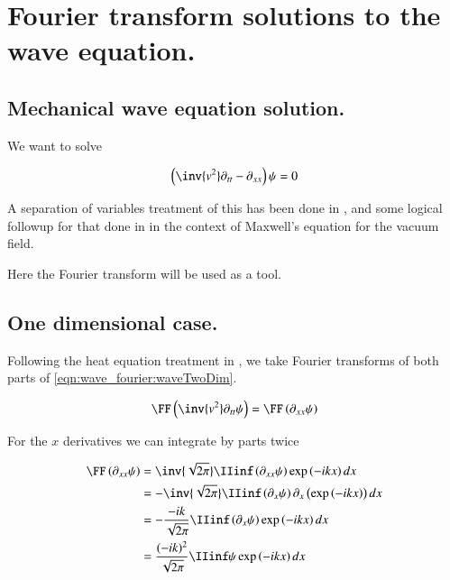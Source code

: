 \chapter{Fourier transform solutions to the wave equation.}\label{chap:PJwaveFourier}
\label{chap:PJwaveFourier}
\date{ Jan 26, 2009.  $RCSfile: waveFourier.tex,v $ Last $Revision: 1.12 $ $Date: 2009/10/22 02:07:20 $ }

\section{Mechanical wave equation solution. }

We want to solve

\begin{align}\label{eqn:wave_fourier:waveTwoDim}
\left(\inv{v^2} \partial_{tt} - \partial_{xx}\right) \psi = 0
\end{align}

A separation of variables treatment of this has been done in
, and some logical followup for that done in
 in the context of Maxwell's equation for the vacuum field.

Here the Fourier transform will be used as a tool.

\section{One dimensional case. }

Following the heat equation treatment in , we take Fourier transforms 
of both parts of \ref{eqn:wave_fourier:waveTwoDim}.

\begin{align*}
\FF\left( \inv{v^2} \partial_{tt} \psi \right) = \FF\left( \partial_{xx} \psi \right)
\end{align*}

For the $x$ derivatives we can integrate by parts twice

\begin{align*}
\FF\left( \partial_{xx} \psi \right)
&= \inv{\sqrt{2 \pi}} \IIinf \left( \partial_{xx} \psi \right) \exp\left( -i k x \right) dx \\
&= -\inv{\sqrt{2 \pi}} \IIinf \left( \partial_{x} \psi \right) \partial_x\left(\exp\left( -i k x \right) \right) dx \\
&= -\frac{-i k}{\sqrt{2 \pi}} \IIinf \left( \partial_{x} \psi \right) \exp\left( -i k x \right) dx \\
&= \frac{(-i k)^2}{\sqrt{2 \pi}} \IIinf \psi \exp\left( -i k x \right) dx \\
\end{align*}

